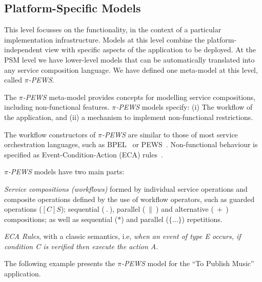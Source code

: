 
\subsection{Platform-Specific Models}


This level focusses on the functionality, in the context of a particular implementation infrastructure.
Models at this level combine the platform-independent view with specific aspects of the application to be deployed. 
At the PSM level we have lower-level models that can be automatically translated into any service composition language. 
We have defined one meta-model at this level, called \textit{$\pi$-PEWS}.

The \textit{$\pi$-PEWS} meta-model provides concepts for modelling service compositions, including non-functional features.
\textit{$\pi$-PEWS} models specify: (i) The workflow of the application, and (ii) a mechanism to implement non-functional restrictions.  

The workflow constructors of \textit{$\pi$-PEWS} are similar to those of  most service orchestration languages, such as BPEL~\cite{bpel03} or PEWS~\cite{BaCAM05,Placido2010LTPD}.
Non-functional behaviour is specified as Event-Condition-Action (ECA) rules~\cite{ECA}.

\textit{$\pi$-PEWS} models have two main parts:
\begin{itemizedTrivlist}
\item \textit{Service compositions (workflows)} formed by individual service operations and composite operations defined by the use of workflow operators, such as guarded operations ($[C]S$); sequential ($\ . \ $), parallel ($\ \| \ $) and alternative ($\ + \ $) compositions; as well as sequential ($*$) and parallel ($\{\dots\}$) repetitions.

\item \textit{ECA Rules}, with a classic semantics, i.e, {\em when an event of type E occurs, if condition C is verified then execute the action A}. 
\end{itemizedTrivlist}


The following example presents the \textit{$\pi$-PEWS} model for the ``To Publish Music'' application.

